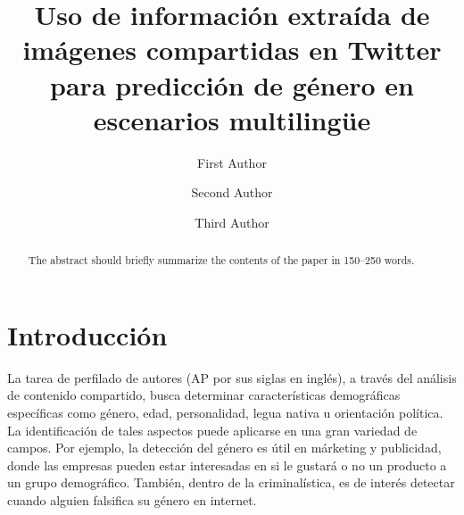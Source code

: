 \documentclass[runningheads]{llncs}
\begin{document}
%
\title{Uso de información extraída de imágenes compartidas en Twitter para predicción de género en escenarios multilingüe}


\author{First Author \and
Second Author \and
Third Author}
%
%

\maketitle

\begin{abstract}
The abstract should briefly summarize the contents of the paper in
150--250 words.

\end{abstract}

\section{Introducción}

La tarea de perfilado de autores (AP por sus siglas en inglés), a través
del análisis de contenido compartido, busca determinar características demográficas 
específicas como género, edad, personalidad, legua nativa u orientación 
política\cite{rangel_rosso_montes-y-gomez_potthast_stein}. La identificación de tales 
aspectos puede aplicarse en una gran variedad de campos. Por ejemplo, la detección del 
género es útil en márketing y publicidad, donde las empresas pueden estar interesadas
en si le gustará o no un producto a un grupo demográfico\cite{miller_dickinson_hu_2012}.
También, dentro de la criminalística, es de interés detectar cuando alguien falsifica su género en internet\cite{cheng_chandramouli_subbalakshmi_2011}. 
\end{document}
